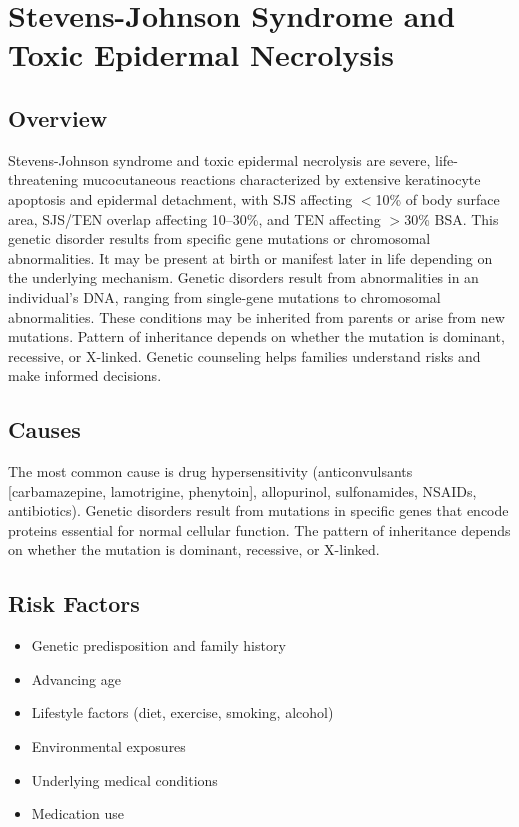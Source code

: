 \chapter{Stevens-Johnson Syndrome and Toxic Epidermal Necrolysis}
\label{sec:Stevens-Johnson Syndrome and Toxic Epidermal Necrolysis}

\section{Overview}
Stevens-Johnson syndrome and toxic epidermal necrolysis are severe, life-threatening mucocutaneous reactions characterized by extensive keratinocyte apoptosis and epidermal detachment, with SJS affecting $<$10\% of body surface area, SJS/TEN overlap affecting 10--30\%, and TEN affecting $>$30\% BSA. This genetic disorder results from specific gene mutations or chromosomal abnormalities. It may be present at birth or manifest later in life depending on the underlying mechanism. Genetic disorders result from abnormalities in an individual's DNA, ranging from single-gene mutations to chromosomal abnormalities. These conditions may be inherited from parents or arise from new mutations. Pattern of inheritance depends on whether the mutation is dominant, recessive, or X-linked. Genetic counseling helps families understand risks and make informed decisions.
\section{Causes}
The most common cause is drug hypersensitivity (anticonvulsants [carbamazepine, lamotrigine, phenytoin], allopurinol, sulfonamides, NSAIDs, antibiotics). Genetic disorders result from mutations in specific genes that encode proteins essential for normal cellular function. The pattern of inheritance depends on whether the mutation is dominant, recessive, or X-linked.   
\section{Risk Factors}

\begin{itemize}[noitemsep]
  \item Genetic predisposition and family history
  \item Advancing age
  \item Lifestyle factors (diet, exercise, smoking, alcohol)
  \item Environmental exposures
  \item Underlying medical conditions
  \item Medication use
\end{itemize}
